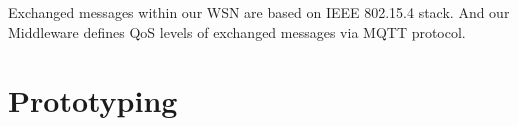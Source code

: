Exchanged messages within our WSN are based on IEEE 802.15.4 stack. And our Middleware defines QoS levels of exchanged messages via MQTT protocol.  








\section{Prototyping} \label{sec:Prototyping}

